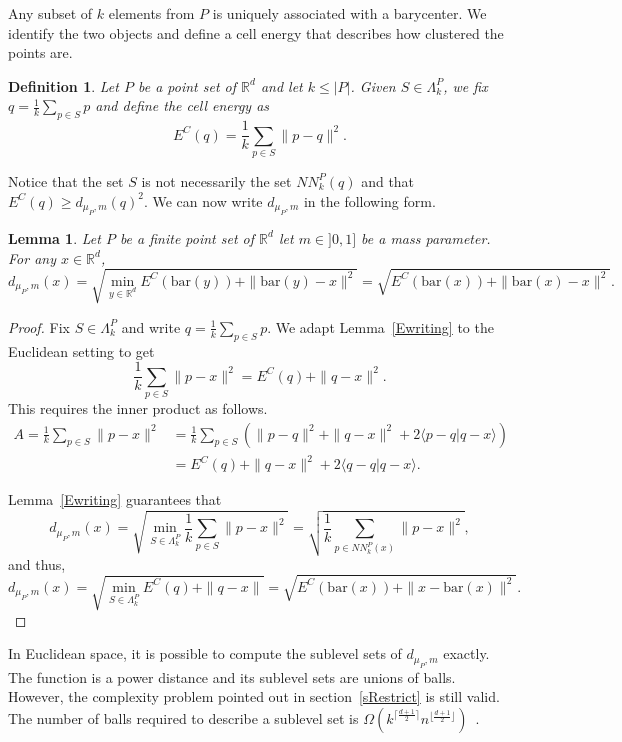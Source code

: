\documentclass[a4paper]{article}
\newcommand\norm[1]{\|#1\|}
\newcommand\bary[1]{\mathrm{bar}(#1)}
\newcommand\dmP{d_{\mu_P,m}}
\newcommand\R{\mathbb{R}}
\newtheorem{definition}[theorem]{Definition}
\newtheorem{lemma}[theorem]{Lemma}
\begin{document}
Any subset of $k$ elements from $P$ is uniquely associated with a barycenter. 
We identify the two objects and define a cell energy that describes how clustered the points are.

\begin{definition}
Let $P$ be a point set of $\R^d$ and let $k\leq|P|$.
Given $S\in\Lambda_k^P$, we fix $q=\frac{1}{k}\sum_{p\in S}p$ and define the cell energy as
\[
  E^C(q)=\frac{1}{k}\sum_{p\in S}\norm{p-q}^2.
\]
\end{definition}

Notice that the set $S$ is not necessarily the set $NN_k^P(q)$ and that $E^C(q)\geq\dmP(q)^2$.
We can now write $\dmP$ in the following form.

\begin{lemma}\label{lempiricaldef}
Let $P$ be a finite point set of $\R^d$ let $m\in]0,1]$ be a mass parameter.
For any $x\in\R^d$,
$$\dmP(x)=\sqrt{\min_{y\in \R^d}E^C(\bary{y})+\norm{\bary{y}-x}^2}=\sqrt{E^C(\bary{x})+\norm{\bary{x}-x}^2}.$$
\end{lemma}

\begin{proof}
Fix $S\in\Lambda_k^P$ and write $q=\frac{1}{k}\sum_{p\in S}p$. 
We adapt Lemma~\ref{Ewriting} to the Euclidean setting to get
\[
  \frac{1}{k}\sum_{p\in S}\norm{p-x}^2=E^C(q)+\norm{q-x}^2.
\]
This requires the inner product as follows.
\begin{align*}
A=\frac{1}{k}\sum_{p\in S}\norm{p-x}^2&=\frac{1}{k}\sum_{p\in S}\left(\norm{p-q}^2+\norm{q-x}^2+2\langle p-q|q-x\rangle\right)\\
&=E^C(q)+\norm{q-x}^2+2\langle q-q|q-x\rangle.
\end{align*}

Lemma~\ref{Ewriting} guarantees that
\[
  \dmP(x)=\sqrt{\min_{S\in\Lambda_k^P}\frac{1}{k}\sum_{p\in S}\norm{p-x}^2}=\sqrt{\frac{1}{k}\sum_{p\in NN_k^P(x)}\norm{p-x}^2},
\]
and thus,
\[
  \dmP(x) 
  = \sqrt{\min_{S\in\Lambda_k^P}E^C(q)+\norm{q-x}} 
  = \sqrt{E^C(\bary{x})+\norm{x-\bary{x}}^2}.
\]
\end{proof}

In Euclidean space, it is possible to compute the sublevel sets of $\dmP$ exactly.
The function is a power distance and its sublevel sets are unions of balls.
However, the complexity problem pointed out in section~\ref{sRestrict} is still valid. 
The number of balls required to describe a sublevel set is $\Omega(k^{\lceil\frac{d+1}{2}\rceil}n^{\lfloor\frac{d+1}{2}\rfloor})$~\cite{arscgCS}.
\end{document}
